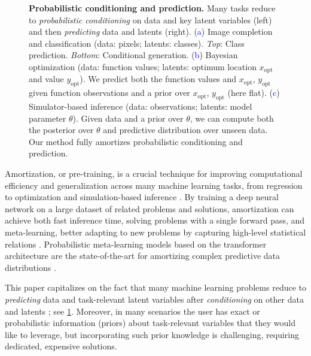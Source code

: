 \documentclass[twoside]{article}
\begin{document}
\begin{figure}[h!]
        
    \caption{\textbf{Probabilistic conditioning and prediction.} Many tasks reduce to \emph{probabilistic conditioning} on data and key latent variables (left) and then \emph{predicting} data and latents (right). (\textcolor{blue}{a}) Image completion and classification (data: pixels; latents: classes). \emph{Top}: Class prediction. \emph{Bottom}: Conditional generation. (\textcolor{blue}{b}) Bayesian optimization (data: function values; latents: optimum location $x_\text{opt}$ and value $y_\text{opt}$). We predict both the function values and $x_\text{opt}$, $y_\text{opt}$ given function observations and a prior over $x_\text{opt}$, $y_\text{opt}$ (here flat). (\textcolor{blue}{c}) Simulator-based inference (data: observations; latents: model parameter $\theta$). Given data and a prior over $\theta$, we can compute both the posterior over $\theta$ and predictive distribution over unseen data.
    Our method fully amortizes probabilistic conditioning and prediction.}
    \label{fig:intro}
    \vspace{-0.3cm}
\end{figure}


Amortization, or pre-training, is a crucial technique for improving computational efficiency and generalization across many machine learning tasks, from regression \citep{garnelo2018neural} to optimization \citep{amos2022tutorial} and simulation-based inference \citep{cranmer2020frontier}. By training a deep neural network on a large dataset of related problems and solutions, amortization can achieve both fast inference time, solving problems with a single forward pass, and meta-learning, better adapting to new problems by capturing high-level statistical relations \citep{brown2020language}. 
Probabilistic meta-learning models based on the transformer architecture \citep{vaswani2017attention} are the state-of-the-art for amortizing complex predictive data distributions \citep{nguyen2022transformer, muller2022transformers}. 

\begin{tcolorbox}[colback=red!5!white,colframe=red!75!black]
This paper capitalizes on the fact that many machine learning problems reduce to \emph{predicting} data and task-relevant latent variables after \emph{conditioning} on other data and latents \citep{ghahramani2015probabilistic}; see \cref{fig:intro}. 
Moreover, in many scenarios the user has exact or probabilistic information (priors) about task-relevant variables that they would like to leverage, but incorporating such prior knowledge is challenging, requiring dedicated, expensive solutions.
\end{tcolorbox}
\end{document}
